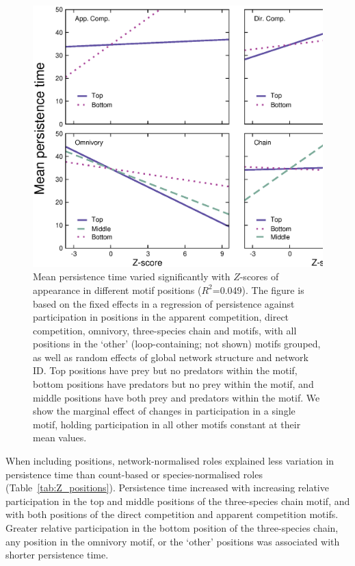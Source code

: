 \documentclass[12pt]{article}
\begin{document}
\begin{spacing}{2.0}
        \begin{figure}[ht!]
            \centering
            \includegraphics[width=\textwidth]{figures/roles/persistence_vs_positions_Z.eps}
            \caption{Mean persistence time varied significantly with $Z$-scores of appearance in different motif positions ($R^2$=0.049). The figure is based on the fixed effects in a regression of persistence against participation in positions in the apparent competition, direct competition, omnivory, three-species chain and motifs, with all positions in the `other' (loop-containing; not shown) motifs grouped, as well as random effects of global network structure and network ID. Top positions have prey but no predators within the motif, bottom positions have predators but no prey within the motif, and middle positions have both prey and predators within the motif. We show the marginal effect of changes in participation in a single motif, holding participation in all other motifs constant at their mean values.}
            \label{fig:persistence_positions_Z}
        \end{figure}

        When including positions, network-normalised roles explained less variation in persistence time than count-based or species-normalised roles (Table~\ref{tab:Z_positions}).
        Persistence time increased with increasing relative participation in the top and middle positions of the three-species chain motif, and with both positions of the direct competition and apparent competition motifs.
        Greater relative participation in the bottom position of the three-species chain, any position in the omnivory motif, or the `other' positions was associated with shorter persistence time.
        


\end{spacing}
\end{document}
